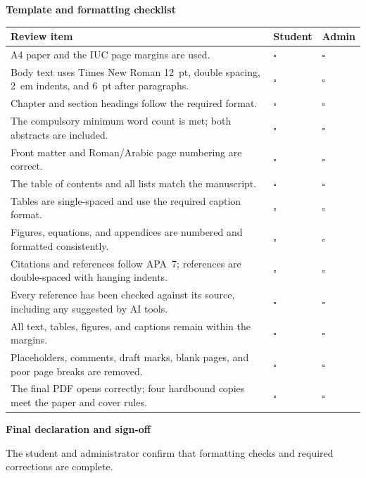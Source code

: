 \documentclass[11pt,a4paper]{article}
\newcommand\cbox{$\square$}
\begin{document}
\vspace{6pt}
{\large\bfseries Template and formatting checklist\par}\vspace{3pt}
{\footnotesize
\begin{tabularx}{\textwidth}{@{}X>{\centering\arraybackslash}p{13mm}>{\centering\arraybackslash}p{13mm}@{}}
\toprule
\textbf{Review item} & \textbf{Student} & \textbf{Admin} \\
\midrule
A4 paper and the IUC page margins are used. & \cbox & \cbox \\
Body text uses Times New Roman 12~pt, double spacing, 2~em indents, and 6~pt after paragraphs. & \cbox & \cbox \\
Chapter and section headings follow the required format. & \cbox & \cbox \\
The compulsory minimum word count is met; both abstracts are included. & \cbox & \cbox \\
Front matter and Roman/Arabic page numbering are correct. & \cbox & \cbox \\
The table of contents and all lists match the manuscript. & \cbox & \cbox \\
Tables are single-spaced and use the required caption format. & \cbox & \cbox \\
Figures, equations, and appendices are numbered and formatted consistently. & \cbox & \cbox \\
Citations and references follow APA~7; references are double-spaced with hanging indents. & \cbox & \cbox \\
Every reference has been checked against its source, including any suggested by AI tools. & \cbox & \cbox \\
All text, tables, figures, and captions remain within the margins. & \cbox & \cbox \\
Placeholders, comments, draft marks, blank pages, and poor page breaks are removed. & \cbox & \cbox \\
The final PDF opens correctly; four hardbound copies meet the paper and cover rules. & \cbox & \cbox \\
\bottomrule
\end{tabularx}}

\vspace{8pt}
{\large\bfseries Final declaration and sign-off\par}\vspace{3pt}
The student and administrator confirm that formatting checks and required
corrections are complete.
\end{document}
